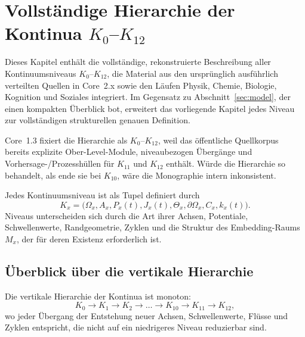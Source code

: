 
\section{Vollständige Hierarchie der Kontinua \texorpdfstring{\texorpdfstring{$K_0$}{K\_0}–$K_{12}$}{K0–K12}}
\label{sec:klevels-full}

Dieses Kapitel enthält die vollständige, rekonstruierte Beschreibung aller
Kontinuumsniveaus \(K_0\)–\(K_{12}\), die Material aus den ursprünglich
ausführlich verteilten Quellen in Core~2.x sowie den Läufen Physik, Chemie,
Biologie, Kognition und Soziales integriert.
Im Gegensatz zu Abschnitt~\ref{sec:model}, der einen kompakten Überblick bot,
erweitert das vorliegende Kapitel jedes Niveau zur vollständigen strukturellen
genauen Definition.

Core~1.3 fixiert die Hierarchie als \(K_0\)–\(K_{12}\), weil das öffentliche
Quellkorpus bereits explizite Ober-Level-Module, niveaubezogen Übergänge und
Vorhersage-/Prozesshüllen für \(K_{11}\) und \(K_{12}\) enthält.
Würde die Hierarchie so behandelt, als ende sie bei \(K_{10}\), wäre die
Monographie intern inkonsistent.

Jedes Kontinuumsniveau ist als Tupel definiert durch
\[
    K_x = \big(\Omega_x, A_x, P_x(t), J_x(t), \Theta_x,
           \partial\Omega_x, C_x, k_x(t)\big).
\]
Niveaus unterscheiden sich durch die Art ihrer Achsen, Potentiale, Schwellenwerte,
Randgeometrie, Zyklen und die Struktur des Embedding-Raums
\(M_x\), der für deren Existenz erforderlich ist.

\subsection{Überblick über die vertikale Hierarchie}

Die vertikale Hierarchie der Kontinua ist monoton:
\[
    K_0 \rightarrow K_1 \rightarrow K_2 \rightarrow \dots
    \rightarrow K_{10} \rightarrow K_{11} \rightarrow K_{12},
\]
wo jeder Übergang der Entstehung neuer Achsen,
Schwellenwerte, Flüsse und Zyklen entspricht, die nicht auf ein niedrigeres
Niveau reduzierbar sind.


